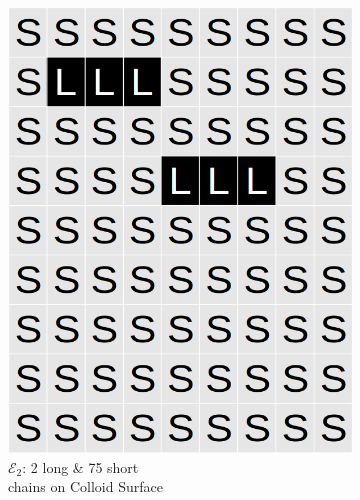 \documentclass[journal=mamobx,manuscript=article]{achemso}
\begin{document}
\begin{figure}[H]
\begin{subfigure}[b]{0.4\textwidth}
        \includegraphics[scale=0.15]{Sup_Fig1c.png}
        \caption{$\mathcal{E}_2$: 2 long \& 75 short \\chains on Colloid Surface}
        \label{fig:C}
    \end{subfigure}
    \begin{subfigure}[b]{0.4\textwidth}

\end{subfigure}
\end{figure}
\end{document}
